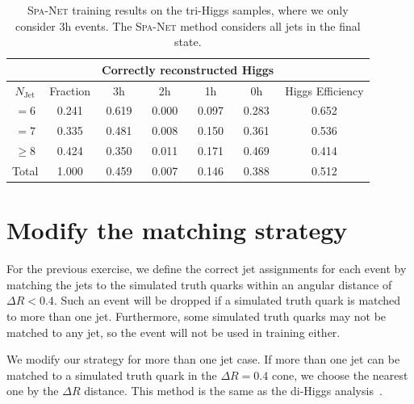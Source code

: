 \documentclass[12pt]{article}
\begin{document}
    \begin{table}[htpb]
		\centering
        \caption{\textsc{Spa-Net} training results on the tri-Higgs samples, where we only consider 3h events. The \textsc{Spa-Net} method considers all jets in the final state.}
		\label{tab:SPANet_triHiggs_3h_new}
		\begin{tabular}{c|c|cccc|c}
			\multicolumn{1}{l|}{} &          & \multicolumn{4}{c|}{Correctly reconstructed Higgs} & \multicolumn{1}{l}{} \\ \hline
			$N_\text{Jet}$        & Fraction & 3h          & 2h         & 1h         & 0h         & Higgs Efficiency     \\ \hline
			$=6$                  & 0.241    & 0.619 & 0.000 & 0.097 & 0.283 &  0.652                \\
			$=7$                  & 0.335    & 0.481 & 0.008 & 0.150 & 0.361 &  0.536                \\
			$\ge 8$               & 0.424    & 0.350 & 0.011 & 0.171 & 0.469 &  0.414                \\ \hline
			Total                 & 1.000    & 0.459 & 0.007 & 0.146 & 0.388 &  0.512               
		\end{tabular}
	\end{table}
\section{Modify the matching strategy}%
\label{sec:modify_the_matching_strategy}
    For the previous exercise, we define the correct jet assignments for each event by matching the jets to the simulated truth quarks within an angular distance of $\Delta R < 0.4$. Such an event will be dropped if a simulated truth quark is matched to more than one jet. Furthermore, some simulated truth quarks may not be matched to any jet, so the event will not be used in training either.

    We modify our strategy for more than one jet case. If more than one jet can be matched to a simulated truth quark in the $\Delta R=0.4$ cone, we choose the nearest one by the $\Delta R$ distance. This method is the same as the di-Higgs analysis~\cite{Stanislaus:2020vfx}.
\end{document}
